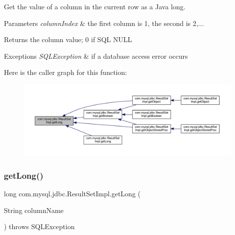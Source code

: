Get the value of a column in the current row as a Java long.


\begin{DoxyParams}{Parameters}
{\em column\+Index} & the first column is 1, the second is 2,...\\
\hline
\end{DoxyParams}
\begin{DoxyReturn}{Returns}
the column value; 0 if S\+QL N\+U\+LL
\end{DoxyReturn}

\begin{DoxyExceptions}{Exceptions}
{\em S\+Q\+L\+Exception} & if a database access error occurs \\
\hline
\end{DoxyExceptions}
Here is the caller graph for this function\+:
\nopagebreak
\begin{figure}[H]
\begin{center}
\leavevmode
\includegraphics[width=350pt]{classcom_1_1mysql_1_1jdbc_1_1_result_set_impl_a5bc3a43633fc4301e35603a9516712c3_icgraph}
\end{center}
\end{figure}
\mbox{\label{classcom_1_1mysql_1_1jdbc_1_1_result_set_impl_aeb04e9c6a16658943e9da23b0e5a7ccd}} 
\subsubsection{\texorpdfstring{get\+Long()}{getLong()}\hspace{0.1cm}{\footnotesize\ttfamily [2/2]}}
{\footnotesize\ttfamily long com.\+mysql.\+jdbc.\+Result\+Set\+Impl.\+get\+Long (\begin{DoxyParamCaption}\item[{String}]{column\+Name }\end{DoxyParamCaption}) throws S\+Q\+L\+Exception}


